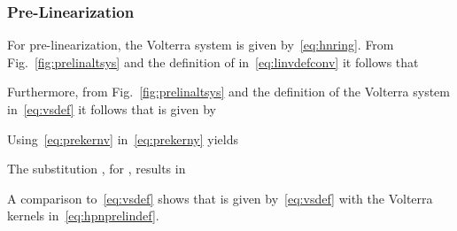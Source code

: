 \documentclass[10pt,twocolumn,twoside]{IEEEtran}
\begin{document}
\subsubsection{Pre-Linearization}

For pre-linearization, the Volterra system  is given by~\eqref{eq:hnring}.
From Fig.~\ref{fig:prelinaltsys} and the definition of  in~\eqref{eq:linvdefconv}
it follows that

Furthermore, from Fig.~\ref{fig:prelinaltsys} and the definition of the Volterra
system in~\eqref{eq:vsdef} it follows that  is given by

Using~\eqref{eq:prekernv} in~\eqref{eq:prekerny} yields

The substitution , for , results in

A comparison to~\eqref{eq:vsdef} shows that  is given by~\eqref{eq:vsdef}
with the Volterra kernels in~\eqref{eq:hpnprelindef}.





\vspace*{3em}
\end{document}
